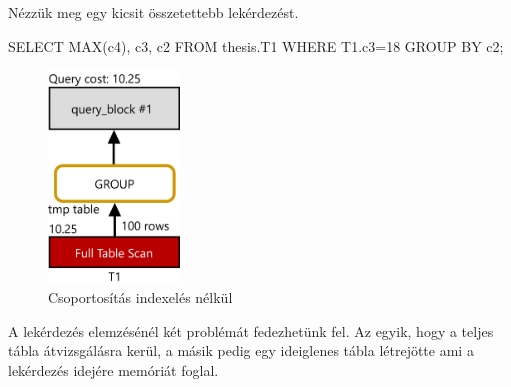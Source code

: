 Nézzük meg egy kicsit összetettebb lekérdezést.
\begin{python} 
SELECT MAX(c4), c3, c2 FROM thesis.T1 WHERE T1.c3=18 GROUP BY c2;
\end{python}

\begin{figure}[h!]
\centering
\includegraphics[width=3.5cm]{images/explain/2-1.png}
\caption{Csoportosítás indexelés nélkül}
\label{fig:schema}
\end{figure}

A lekérdezés elemzésénél két problémát fedezhetünk fel. Az egyik, hogy a teljes tábla átvizsgálásra kerül, a másik pedig egy ideiglenes tábla létrejötte ami a lekérdezés idejére memóriát foglal.

